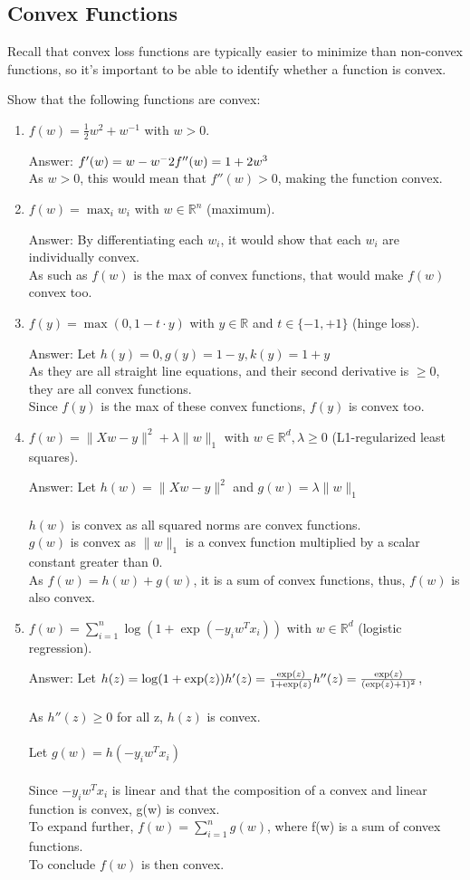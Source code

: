 \documentclass{article}
\def\ans#1{\par\gre{Answer: #1}}
\def\blu#1{{\color{blu}#1}}
\def\gre#1{{\color{gre}#1}}
\def\norm#1{\|#1\|}
\def\R{\mathbb{R}}
\def\half{\frac 1 2}
\def\enum#1{\begin{enumerate}#1\end{enumerate}}
\begin{document}
\pagebreak

\subsection{Convex Functions}

Recall that convex loss functions are typically easier to minimize than non-convex functions, so it's important to be able to identify whether a function is convex.

\blu{Show that the following functions are convex}:

\enum{
\item $f(w) = \half w^2 + w^{-1}$ with $w > 0$.
\ans{$f'(w) = w - w^-2\\
f''(w) = 1 + 2w^3$\\
As $w > 0$, this would mean that $f''(w) > 0$, making the function convex.}
\item $f(w) = \max_i w_i$ with $w \in \R^n$ (maximum).
\ans{By differentiating each $w_i$, it would show that each $w_i$ are individually convex. \\
As such as $f(w)$ is the max of convex functions, that would make $f(w)$ convex too.}
\item $f(y) = \max(0,1-t\cdot y)$ with $y\in \R$ and $t\in\{-1,+1\}$ (hinge loss).
\ans{Let $h(y) = 0, g(y) = 1 - y, k(y) = 1 + y$ \\
As they are all straight line equations, and their second derivative is $\geq 0$, they are all convex functions.\\
Since $f(y)$ is the max of these convex functions, $f(y)$ is convex too.}
\item $f(w) = \norm{Xw-y}^2 + \lambda\norm{w}_1$ with $w \in \R^d, \lambda \geq 0$ (L1-regularized least squares).
\ans{Let $h(w) = \norm{Xw-y}^2$ and $g(w) = \lambda\norm{w}_1$\\\\
$h(w)$ is convex as all squared norms are convex functions. \\
$g(w)$ is convex as $\norm{w}_1$ is a convex function multiplied by a scalar constant greater than 0. \\
As $f(w) = h(w) + g(w)$, it is a sum of convex functions, thus, $f(w)$ is also convex.}
\item $f(w) = \sum_{i=1}^n \log(1+\exp(-y_iw^Tx_i)) $ with $w \in \R^d$ (logistic regression).
\ans{Let $h(z) = \log(1+\exp(z)) \\
\\
h'(z) = \frac{\exp(z)}{1+\exp(z)} \\
h''(z) = \frac{\exp(z)}{(\exp(z) + 1)^2}$, \\
\\
As $h''(z) \geq 0$ for all z, $h(z)$ is convex. \\
\\
Let $g(w) =  h(-y_i w^T x_i)$ \\
\\
Since $-y_i w^T x_i$ is linear and that the composition of a convex and linear function is convex, g(w) is convex. \\
To expand further, $f(w) = \sum_{i=1}^n g(w)$, where f(w) is a sum of convex functions. \\
To conclude $f(w)$ is then convex.}
}
\end{document}
